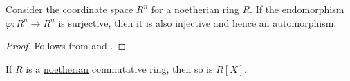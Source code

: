 \begin{proposition}\label{thm:surjective_endomorphism_in_free_module}
  Consider the \hyperref[def:coordinate_space]{coordinate space} \( R^n \) for a \hyperref[def:noetherian_semiring]{noetherian ring} \( R \). If the endomorphism \( \varphi: R^n \to R^n \) is surjective, then it is also injective and hence an automorphism.
\end{proposition}
\begin{proof}
  Follows from  and .
\end{proof}

\begin{theorem}\label{thm:hilberts_basis_theorem}
  If \( R \) is a \hyperref[def:noetherian_semiring]{noetherian} commutative ring, then so is \( R[X] \).
\end{theorem}

